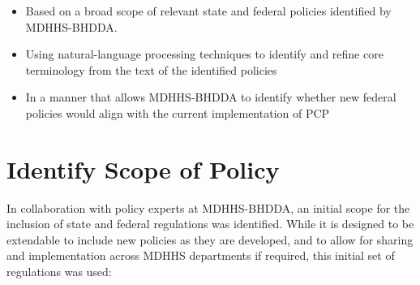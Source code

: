 \documentclass[
]{book}
\providecommand{\tightlist}{%
  \setlength{\itemsep}{0pt}\setlength{\parskip}{0pt}}
\begin{document}
\begin{itemize}
\tightlist
\item
  Based on a broad scope of relevant state and federal policies identified by MDHHS-BHDDA.
\item
  Using natural-language processing techniques to identify and refine core terminology from the text of the identified policies
\item
  In a manner that allows MDHHS-BHDDA to identify whether new federal policies would align with the current implementation of PCP
\end{itemize}

\hypertarget{identify-scope-of-policy}{%
\section{Identify Scope of Policy}\label{identify-scope-of-policy}}

In collaboration with policy experts at MDHHS-BHDDA, an initial scope for the inclusion of state and federal regulations was identified. While it is designed to be extendable to include new policies as they are developed, and to allow for sharing and implementation across MDHHS departments if required, this initial set of regulations was used:
\end{document}
